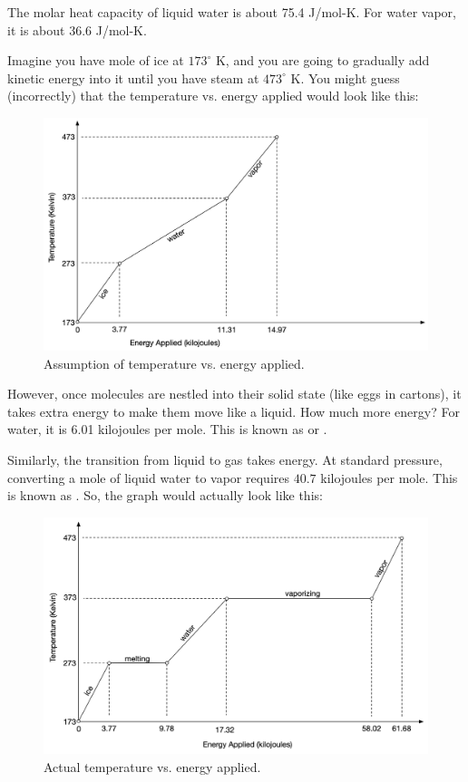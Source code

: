 The molar heat capacity of liquid water is about 75.4 J/mol-K. For water vapor, it is about 36.6 J/mol-K.

Imagine you have mole of ice at $173^\circ$ K, and you are going to gradually add kinetic energy into it until you have steam at $473^\circ$ K. You might guess (incorrectly) that the temperature vs. energy applied would look like this:
\begin{figure}[htbp]
    \centering
    \includegraphics[width=0.8\linewidth]{energynaive.png}
    \caption{Assumption of temperature vs. energy applied.}
    \label{fig:energy1}
\end{figure}

However, once molecules are nestled into their solid state (like eggs in cartons), it takes extra energy to make them move like a liquid. How much more energy? For water, it is 6.01 kilojoules per mole. This is known as  or .

Similarly, the transition from liquid to gas takes energy. At standard pressure, converting a mole of liquid water to vapor requires $40.7$ kilojoules per mole. This is known as . So, the graph would actually look like this:
\begin{figure}[htbp]
    \centering
    \includegraphics[width=0.8\linewidth]{energysoph.png}
    \caption{Actual temperature vs. energy applied.}
    \label{fig:energy2}
\end{figure}

